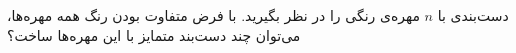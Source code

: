 \p
دست‌بندی با
$n$
مهره‌ی رنگی را در نظر بگیرید. با فرض متفاوت بودن رنگ‌ همه مهره‌ها، می‌توان چند دست‌بند متمایز با این مهره‌ها ساخت؟